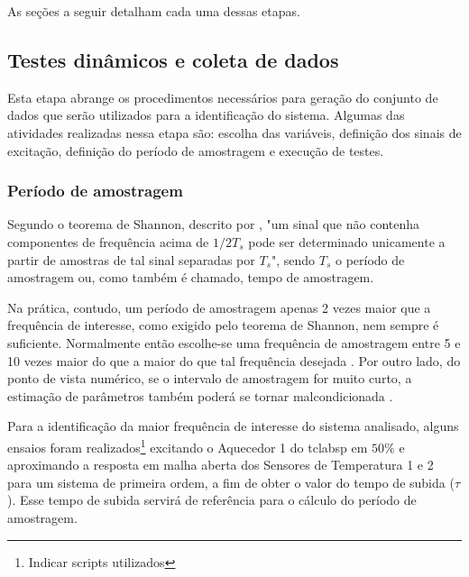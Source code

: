As seções a seguir detalham cada uma dessas etapas.

\subsection{Testes dinâmicos e coleta de dados}
\label{subsec:testes_dinamicos_e_coleta_de_dados}

Esta etapa abrange os procedimentos necessários para geração do conjunto de dados que serão utilizados
para a identificação do sistema. Algumas das atividades realizadas nessa etapa são: escolha das variáveis,
definição dos sinais de excitação, definição do período de amostragem e execução de testes.
\cite{Aguirre2015}

\subsubsection{Período de amostragem}
\label{subsubsec:periodo_de_amostragem}

Segundo o teorema de Shannon, descrito por , "um sinal que não contenha componentes
de frequência acima de $1/2T_s$ pode ser determinado unicamente a partir de amostras de tal sinal separadas
por $T_s$", sendo $T_s$ o período de amostragem ou, como também é chamado, tempo de amostragem.

Na prática, contudo, um período de amostragem apenas 2 vezes maior que a frequência de interesse, como exigido
pelo teorema de Shannon, nem sempre é suficiente. Normalmente então escolhe-se uma frequência de amostragem
entre 5 e 10 vezes maior do que a maior do que tal frequência desejada \cite{Aguirre2015}. Por outro lado, do
ponto de vista numérico, se o intervalo de amostragem for muito curto, a estimação de parâmetros também
poderá se tornar malcondicionada \cite{Aguirre2015}.

Para a identificação da maior frequência de interesse do sistema analisado, alguns ensaios foram realizados\footnote{
    Indicar scripts utilizados          %
}
excitando o Aquecedor 1 do \acrshort{tclabsp} em $50\%$ e aproximando a resposta em malha aberta dos
Sensores de Temperatura 1 e 2 para um sistema de primeira ordem, a fim de obter o valor do tempo de subida
($\tau$). Esse tempo de subida servirá de referência para o cálculo do período de amostragem.

